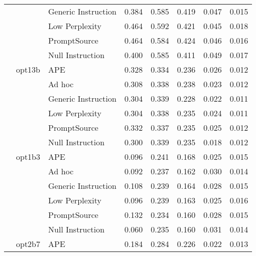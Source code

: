 \begin{supertabular}{lllrrrrr}
              &        & Generic Instruction &            0.384 &           0.585 &          0.419 &        0.047 &    0.015 \\
              &        & Low Perplexity &            0.464 &           0.592 &          0.421 &        0.045 &    0.018 \\
              &        & PromptSource &            0.464 &           0.584 &          0.424 &        0.046 &    0.016 \\
              &        & Null Instruction &            0.400 &           0.585 &          0.411 &        0.049 &    0.017 \\
              & opt13b & APE &            0.328 &           0.334 &          0.236 &        0.026 &    0.012 \\
              &        & Ad hoc &            0.308 &           0.338 &          0.238 &        0.023 &    0.012 \\
              &        & Generic Instruction &            0.304 &           0.339 &          0.228 &        0.022 &    0.011 \\
              &        & Low Perplexity &            0.304 &           0.338 &          0.235 &        0.024 &    0.011 \\
              &        & PromptSource &            0.332 &           0.337 &          0.235 &        0.025 &    0.012 \\
              &        & Null Instruction &            0.300 &           0.339 &          0.235 &        0.018 &    0.012 \\
              & opt1b3 & APE &            0.096 &           0.241 &          0.168 &        0.025 &    0.015 \\
              &        & Ad hoc &            0.092 &           0.237 &          0.162 &        0.030 &    0.014 \\
              &        & Generic Instruction &            0.108 &           0.239 &          0.164 &        0.028 &    0.015 \\
              &        & Low Perplexity &            0.096 &           0.239 &          0.163 &        0.025 &    0.016 \\
              &        & PromptSource &            0.132 &           0.234 &          0.160 &        0.028 &    0.015 \\
              &        & Null Instruction &            0.060 &           0.235 &          0.160 &        0.031 &    0.014 \\
              & opt2b7 & APE &            0.184 &           0.284 &          0.226 &        0.022 &    0.013 \\

\end{supertabular}
